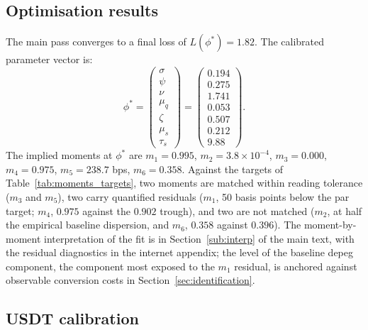 \subsection{Optimisation results}\label{sub:opt_results}

The main pass converges to a final loss of $L(\phi^*) = 1.82$. The calibrated parameter vector is:
\begin{equation}\label{eq:phi_star}
\phi^* = \begin{pmatrix}
\sigma \\ \psi \\ \nu \\ \mu_q \\ \zeta \\ \mu_s \\ \tau_s
\end{pmatrix} = \begin{pmatrix}
0.194 \\ 0.275 \\ 1.741 \\ 0.053 \\ 0.507 \\ 0.212 \\ 9.88
\end{pmatrix}.
\end{equation}
The implied moments at $\phi^*$ are $m_1 = 0.995$, $m_2 = 3.8 \times 10^{-4}$, $m_3 = 0.000$, $m_4 = 0.975$, $m_5 = 238.7$ bps, $m_6 = 0.358$. Against the targets of Table~\ref{tab:moments_targets}, two moments are matched within reading tolerance ($m_3$ and $m_5$), two carry quantified residuals ($m_1$, 50 basis points below the par target; $m_4$, $0.975$ against the $0.902$ trough), and two are not matched ($m_2$, at half the empirical baseline dispersion, and $m_6$, $0.358$ against $0.396$). The moment-by-moment interpretation of the fit is in Section~\ref{sub:interp} of the main text, with the residual diagnostics in the internet appendix; the level of the baseline depeg component, the component most exposed to the $m_1$ residual, is anchored against observable conversion costs in Section~\ref{sec:identification}.

\subsection{USDT calibration}\label{sub:usdt_calibration}

